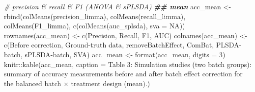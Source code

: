 \documentclass[
]{book}
\newenvironment{Shaded}{\begin{snugshade}}{\end{snugshade}}
\newcommand{\AttributeTok}[1]{\textcolor[rgb]{0.77,0.63,0.00}{#1}}
\newcommand{\CommentTok}[1]{\textcolor[rgb]{0.56,0.35,0.01}{\textit{#1}}}
\newcommand{\ConstantTok}[1]{\textcolor[rgb]{0.00,0.00,0.00}{#1}}
\newcommand{\DecValTok}[1]{\textcolor[rgb]{0.00,0.00,0.81}{#1}}
\newcommand{\DocumentationTok}[1]{\textcolor[rgb]{0.56,0.35,0.01}{\textbf{\textit{#1}}}}
\newcommand{\FunctionTok}[1]{\textcolor[rgb]{0.00,0.00,0.00}{#1}}
\newcommand{\NormalTok}[1]{#1}
\newcommand{\OtherTok}[1]{\textcolor[rgb]{0.56,0.35,0.01}{#1}}
\newcommand{\SpecialCharTok}[1]{\textcolor[rgb]{0.00,0.00,0.00}{#1}}
\newcommand{\StringTok}[1]{\textcolor[rgb]{0.31,0.60,0.02}{#1}}
\begin{document}
\begin{Shaded}
\begin{Highlighting}[]
\CommentTok{\# precision \& recall \& F1 (ANOVA \& sPLSDA)}
\DocumentationTok{\#\# mean}
\NormalTok{acc\_mean }\OtherTok{\textless{}{-}} \FunctionTok{rbind}\NormalTok{(}\FunctionTok{colMeans}\NormalTok{(precision\_limma), }\FunctionTok{colMeans}\NormalTok{(recall\_limma), }
                  \FunctionTok{colMeans}\NormalTok{(F1\_limma), }\FunctionTok{c}\NormalTok{(}\FunctionTok{colMeans}\NormalTok{(auc\_splsda), }\AttributeTok{sva =} \ConstantTok{NA}\NormalTok{))}
\FunctionTok{rownames}\NormalTok{(acc\_mean) }\OtherTok{\textless{}{-}} \FunctionTok{c}\NormalTok{(}\StringTok{\textquotesingle{}Precision\textquotesingle{}}\NormalTok{, }\StringTok{\textquotesingle{}Recall\textquotesingle{}}\NormalTok{, }\StringTok{\textquotesingle{}F1\textquotesingle{}}\NormalTok{, }\StringTok{\textquotesingle{}AUC\textquotesingle{}}\NormalTok{)}
\FunctionTok{colnames}\NormalTok{(acc\_mean) }\OtherTok{\textless{}{-}} \FunctionTok{c}\NormalTok{(}\StringTok{\textquotesingle{}Before correction\textquotesingle{}}\NormalTok{, }\StringTok{\textquotesingle{}Ground{-}truth data\textquotesingle{}}\NormalTok{, }
                        \StringTok{\textquotesingle{}removeBatchEffect\textquotesingle{}}\NormalTok{, }\StringTok{\textquotesingle{}ComBat\textquotesingle{}}\NormalTok{, }
                        \StringTok{\textquotesingle{}PLSDA{-}batch\textquotesingle{}}\NormalTok{, }\StringTok{\textquotesingle{}sPLSDA{-}batch\textquotesingle{}}\NormalTok{, }\StringTok{\textquotesingle{}SVA\textquotesingle{}}\NormalTok{)}
\NormalTok{acc\_mean }\OtherTok{\textless{}{-}} \FunctionTok{format}\NormalTok{(acc\_mean, }\AttributeTok{digits =} \DecValTok{3}\NormalTok{)}
\NormalTok{knitr}\SpecialCharTok{::}\FunctionTok{kable}\NormalTok{(acc\_mean, }\AttributeTok{caption =} \StringTok{\textquotesingle{}Table 3: Simulation studies (two batch groups): summary of accuracy measurements before and after batch effect correction for the balanced batch × treatment design (mean).\textquotesingle{}}\NormalTok{)}
\end{Highlighting}
\end{Shaded}
\end{document}
